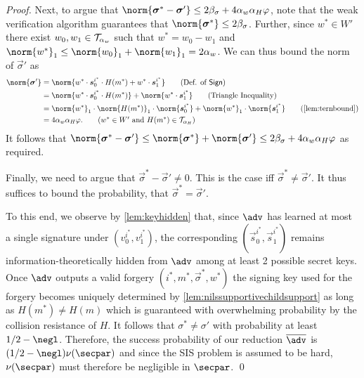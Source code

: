\begin{proof}
  Next, to argue that $\norm{\vec{\sigma}^*-\vec{\sigma}'}\leq 2\beta_\sigma + 4\alpha_w\alpha_H\varphi$, note that the weak verification algorithm guarantees that $\norm{\vec{\sigma}^*} \leq 2\beta_\sigma$.
  Further, since $w^*\in W'$ there exist $w_0,w_1 \in \mathcal{T}_{\alpha_w}$ such that $w^* = w_0-w_1$ and $\norm{w^*}_1 \leq \norm{w_0}_1 + \norm{w_1}_1 = 2\alpha_w$.
  We can thus bound the norm of $\vec{\sigma}'$ as
  \begin{align*}
    \norm{\vec{\sigma}'} ={}& \norm{w^*\cdot\vec{s}^{i^*}_0\cdot H(m^*)+ w^*\cdot\vec{s}^{i^*}_1}\tag{Def. of $\sign$}\\
    ={}&\norm{w^*\cdot\vec{s}^{i^*}_0\cdot H(m^*)}+ \norm{w^*\cdot\vec{s}^{i^*}_1}\tag{Triangle Inequality}\\
    ={}&\norm{w^*}_1\cdot\norm{H(m^*)}_1\cdot\norm{\vec{s}^{i^*}_0} + \norm{w^*}_1\cdot\norm{\vec{s}^{i^*}_1}\tag{\autoref{lem:ternbound}}\\
    ={}&4\alpha_w\alpha_H\varphi.\tag{$w^*\in W'$ and $H(m^*)\in\tern_{\alpha_H}$}
  \end{align*}
  It follows that $\norm{\vec{\sigma}^*-\vec{\sigma}'} \leq \norm{\vec{\sigma}^*}+\norm{\vec{\sigma}'} \leq 2\beta_\sigma + 4\alpha_w\alpha_H\varphi$ as required.

  Finally, we need to argue that $\vec{\sigma}^*-\vec{\sigma}'\neq 0$.
  This is the case iff $\vec{\sigma}^* \neq \vec{\sigma}'$.
  It thus suffices to bound the probability, that $\vec{\sigma}^*=\vec{\sigma}'$.

  To this end, we observe by \autoref{lem:keyhidden} that, since $\adv$ has learned at most a single signature under $(v_0^{i^*},v_1^{i^*})$, the corresponding $(\vec{s}_0^{i^*},\vec{s}_1^{i^*})$ remains information-theoretically hidden from $\adv$ among at least 2 possible secret keys.
  Once $\adv$ outputs a valid forgery $(i^*,m^*,\vec{\sigma}^*,w^*)$ the signing key used for the forgery becomes uniquely determined by \autoref{lem:nilssupportivechildsupport} as long as $H(m^*)\neq H(m)$ which is guaranteed with overwhelming probability by the collision resistance of $H$.
  It follows that $\sigma^* \neq \sigma'$ with probability at least $1/2 - \negl$.
  Therefore, the success probability of our reduction $\sisadvkots$ is $(1/2 - \negl) \nu(\secpar)$ and since the SIS problem is assumed to be hard, $\nu(\secpar)$ must therefore be negligible in $\secpar$.
  \qed
\end{proof}

